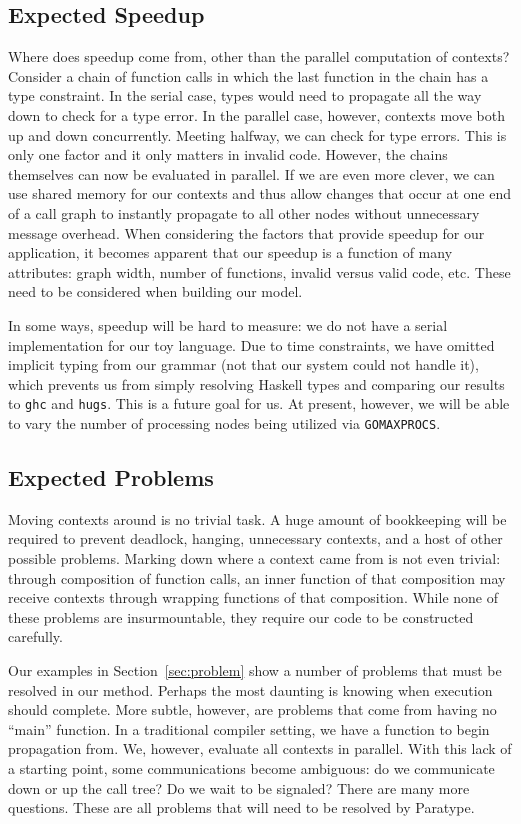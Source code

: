 \documentclass{acm_proc_article-sp}
\begin{document}
\subsection{Expected Speedup}

Where does speedup come from, other than the parallel computation of
contexts? Consider a chain of function calls in which the last
function in the chain has a type constraint. In the serial case, types
would need to propagate all the way down to check for a type error. In
the parallel case, however, contexts move both up and down
concurrently. Meeting halfway, we can check for type errors. This
is only one factor and it only matters in invalid code. However, the
chains themselves can now be evaluated in parallel. If we are even
more clever, we can use shared memory for our contexts and thus allow
changes that occur at one end of a call graph to instantly propagate
to all other nodes without unnecessary message overhead. When
considering the factors that provide speedup for our application, it
becomes apparent that our speedup is a function of many attributes:
graph width, number of functions, invalid versus valid code, etc.
These need to be considered when building our model.

In some ways, speedup will be hard to measure: we do not have a serial
implementation for our toy language. Due to time constraints, we
have omitted implicit typing from our grammar (not that our system
could not handle it), which prevents us from simply resolving Haskell
types and comparing our results to \texttt{ghc} and
\texttt{hugs}. This is a future goal for us. At present, however,
we will be able to vary the number of processing nodes being
utilized via \texttt{GOMAXPROCS}.

\subsection{Expected Problems}

Moving contexts around is no trivial task. A huge amount of
bookkeeping will be required to prevent deadlock, hanging, unnecessary
contexts, and a host of other possible problems. Marking down where a
context came from is not even trivial: through composition of
function calls, an inner function of that composition may receive
contexts through wrapping functions of that composition. While none of
these problems are insurmountable, they require our code to be
constructed carefully.

Our examples in Section~\ref{sec:problem} show a number of problems that must be
resolved in our method. Perhaps the most daunting is knowing when
execution should complete. More subtle, however, are problems that
come from having no ``main'' function. In a traditional compiler
setting, we have a function to begin propagation from. We, however,
evaluate all contexts in parallel. With this lack of a starting point,
some communications become ambiguous: do we communicate down or up
the call tree? Do we wait to be signaled? There are many more questions. These
are all problems that will need to be resolved by Paratype.
\end{document}
